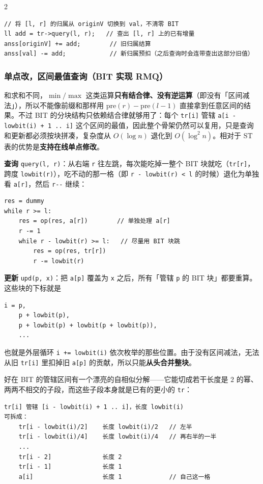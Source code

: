 \begin{multicols*}{2}
		\begin{verbatim}
// 将 [l, r] 的归属从 originV 切换到 val，不清零 BIT
ll add = tr->query(l, r);   // 查出 [l, r] 上的已有增量
anss[originV] += add;        // 旧归属结算
anss[val] -= add;            // 新归属预扣（之后查询时会连带查出这部分旧值）
		\end{verbatim}

		\subsubsection{单点改，区间最值查询（BIT 实现 RMQ）}

		和求和不同，$\min / \max$ 这类运算\textbf{只有结合律、没有逆运算}（即没有「区间减法」），所以不能像前缀和那样用 $\text{pre}(r) - \text{pre}(l-1)$ 直接拿到任意区间的结果。不过 BIT 的分块结构只依赖结合律就够用了：每个 \verb|tr[i]| 管辖 \verb|a[i - lowbit(i) + 1 .. i]| 这个区间的最值，因此整个骨架仍然可以复用，只是查询和更新都必须按块拼凑，复杂度从 $O(\log n)$ 退化到 $O(\log^2 n)$。相对于 ST 表的优势是\textbf{支持在线单点修改}。

		\textbf{查询} \verb|query(l, r)|：从右端 \verb|r| 往左跳，每次能吃掉一整个 BIT 块就吃（\verb|tr[r]|，跨度 \verb|lowbit(r)|），吃不动的那一格（即 \verb|r - lowbit(r) < l| 的时候）退化为单独看 \verb|a[r]|，然后 \verb|r--| 继续：

		\begin{verbatim}
res = dummy
while r >= l:
    res = op(res, a[r])        // 单独处理 a[r]
    r -= 1
    while r - lowbit(r) >= l:   // 尽量用 BIT 块跳
        res = op(res, tr[r])
        r -= lowbit(r)
		\end{verbatim}

		\textbf{更新} \verb|upd(p, x)|：把 \verb|a[p]| 覆盖为 \verb|x| 之后，所有「管辖 \verb|p| 的 BIT 块」都要重算。这些块的下标就是

		\begin{verbatim}
i = p,
    p + lowbit(p),
    p + lowbit(p) + lowbit(p + lowbit(p)),
    ...
		\end{verbatim}

		也就是外层循环 \verb|i += lowbit(i)| 依次枚举的那些位置。由于没有区间减法，无法从旧 \verb|tr[i]| 里扣掉旧 \verb|a[p]| 的贡献，所以只能\textbf{从头合并整块}。

		好在 BIT 的管辖区间有一个漂亮的自相似分解——它能切成若干长度是 $2$ 的幂、两两不相交的子段，而这些子段本身就是已有的更小的 \verb|tr|：

		\begin{verbatim}
tr[i] 管辖 [i - lowbit(i) + 1 .. i]，长度 lowbit(i)
可拆成：
    tr[i - lowbit(i)/2]    长度 lowbit(i)/2   // 左半
    tr[i - lowbit(i)/4]    长度 lowbit(i)/4   // 再右半的一半
    ...
    tr[i - 2]              长度 2
    tr[i - 1]              长度 1
    a[i]                   长度 1             // 自己这一格


\end{verbatim}
\end{multicols*}
